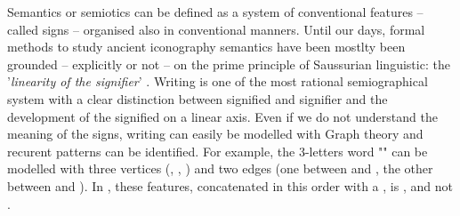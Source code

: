 \documentclass[article]{jss}\usepackage{knitr}
\begin{document}
Semantics or semiotics can be defined as a system of conventional features -- called signs -- organised also in conventional manners. Until our days, formal methods to study ancient iconography semantics have been mostlty been grounded  -- explicitly or not -- on the prime principle of Saussurian linguistic: the '\emph{linearity of the signifier}' \citep{Saussure89}.  
Writing is one of the most rational semiographical system with a clear distinction between signified and signifier and the development of the signified on a linear axis. Even if we do not understand the meaning of the signs, writing can easily be modelled with Graph theory and recurent patterns can be identified. For example, the 3-letters word "" can be modelled with three vertices (, , ) and two edges (one between  and , the other between  and ). In , these features, concatenated in this order with a , is , and not .
\smallbreak
\end{document}
